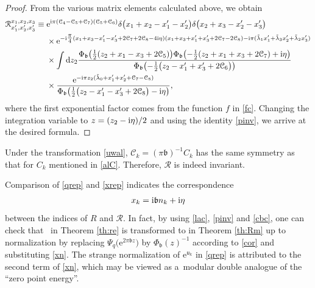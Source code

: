 \documentclass[pdftex]{sigma}
\newcommand{\bb}{{\mathfrak b}}
\newcommand{\e}{{\mathrm e}}
\newcommand{\uu}{{\mathsf u}}
\numberwithin{equation}{section}
\begin{document}
\begin{proof}
 From the various matrix elements calculated above, we obtain
 \begin{align*}
 \mathcal{R}^{x_1,x_2,x_3}_{x'_1,x'_2, x'_3}\equiv{}&
 \e^{{\rm i}\pi(\mathcal{C}_4 - \mathcal{C}_5 + \mathcal{C}_7)(\mathcal{C}_5 + \mathcal{C}_6)}
 \delta\bigl(x_1 + x_2 - x'_1 - x'_2\bigr)\delta\bigl(x_2 + x_3 - x'_2 - x'_3\bigr)
 \\
&\times
 \e^{-{\rm i}\tfrac{\pi}{4}(x_1 + x_3 - x'_1 - x'_3 + 2\mathcal{C}_{7} + 2\mathcal{C}_{8} - 4{\rm i}\eta)(x_1 + x_3 + x'_1 + x'_3 + 2\mathcal{C}_{7} - 2\mathcal{C}_{8})
 - {\rm i}\pi(\tilde{\lambda}_{1} x'_1
 + \tilde{\lambda}_{3} x'_2
 + \tilde{\lambda}_{2} x'_3)}
 \\
 & \times
 \int {\rm d}z_2
 \frac{
 \Phi_\bb\bigl(\tfrac{1}{2}(z_2 + x_1 - x_3 + 2\mathcal{C}_5)\bigr)
 \Phi_\bb\bigl(-\tfrac{1}{2}(z_2 + x_1 + x_3 + 2\mathcal{C}_7)+{\rm i}\eta\bigr)
 }{
 \Phi_\bb\bigl(-\tfrac{1}{2}\bigl(z_2 - x'_1 + x'_3 + 2\mathcal{C}_6\bigr)\bigr)
 }\\
  & \times\frac{\e^{-{\rm i}\pi z_2 (\tilde{\lambda}_0 + x'_1 + x'_2 + \mathcal{C}_7 - \mathcal{C}_8)}}{\Phi_\bb\bigl(\tfrac{1}{2}\bigl(z_2 - x'_1 - x'_3 + 2\mathcal{C}_8\bigr) - {\rm i}\eta\bigr)},
\end{align*}
where the first exponential factor comes from the function $f$ in \eqref{fc}.
Changing the integration variable to $z = (z_2 - {\rm i}\eta)/2$ and using
the identity \eqref{pinv}, we arrive at the desired formula.
\end{proof}

Under the transformation \eqref{uwal},
$\mathcal{C}_k = (\pi \bb)^{-1}C_k$ has the same symmetry as that for $C_k$
mentioned in \eqref{alC}.
Therefore, $\mathcal{R}$ is indeed invariant.

\begin{Remark}\label{re:xn}
Comparison of \eqref{qrep} and \eqref{xrep} indicates the correspondence
\begin{align}\label{xn}
x_k = {\rm i}\bb n_k + {\rm i} \eta
\end{align}
between the indices of $R$ and $\mathcal{R}$.
In fact, by using \eqref{lac}, \eqref{pinv} and \eqref{cbc},
one can check that~ in Theorem \ref{th:re} is transformed to
 in Theorem \ref{th:Rm} up to normalization by
replacing $\Psi_q\bigl(\e^{2\pi \bb z}\bigr)$ by $\Phi_\bb(z)^{-1}$ according to \eqref{cor}
and substituting \eqref{xn}.
%
The strange normalization of $\e^{\uu_k}$ in \eqref{qrep} is attributed
to the second term of \eqref{xn}, which may be viewed as a~modular
double analogue of the ``zero point energy''.
\end{Remark}
\end{document}
